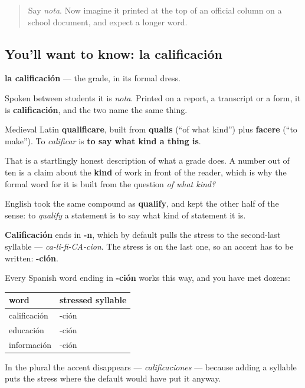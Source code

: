 \label{lesson:ES-C429-calificacion}



\begin{quote}
Say \emph{nota}. Now imagine it printed at the top of an official column on a school document, and expect a longer word.
\end{quote}

\subsection*{You'll want to know: la calificación}
\textbf{la calificación} — the grade, in its formal dress.

Spoken between students it is \emph{nota}. Printed on a report, a transcript or a form, it is \textbf{calificación}, and the two name the same thing.

\begin{cousinweb}
Medieval Latin \textbf{qualificare}, built from \textbf{qualis} (\textquotedblleft{}of what kind\textquotedblright{}) plus \textbf{facere} (\textquotedblleft{}to make\textquotedblright{}). To \emph{calificar} is \textbf{to say what kind a thing is}.

That is a startlingly honest description of what a grade does. A number out of ten is a claim about the \textbf{kind} of work in front of the reader, which is why the formal word for it is built from the question \emph{of what kind?}

English took the same compound as \textbf{qualify}, and kept the other half of the sense: to \emph{qualify} a statement is to say what kind of statement it is.
\end{cousinweb}

\begin{grammarlens}[title={Grammar Lens: where the accent sits, and why}]
\textbf{Calificación} ends in \textbf{-n}, which by default pulls the stress to the second-last syllable — \emph{ca-li-fi-CA-cion}. The stress is on the last one, so an accent has to be written: \textbf{-ción}.

Every Spanish word ending in \textbf{-ción} works this way, and you have met dozens:

\noindent
\begin{tabularx}{\linewidth}{@{}>{\raggedright\arraybackslash}X>{\raggedright\arraybackslash}X@{}}
\toprule
\textbf{word} & \textbf{stressed syllable} \\
\midrule
calificación & -ción \\
educación & -ción \\
información & -ción \\
\bottomrule
\end{tabularx}

In the plural the accent disappears — \emph{calificaciones} — because adding a syllable puts the stress where the default would have put it anyway.
\end{grammarlens}

